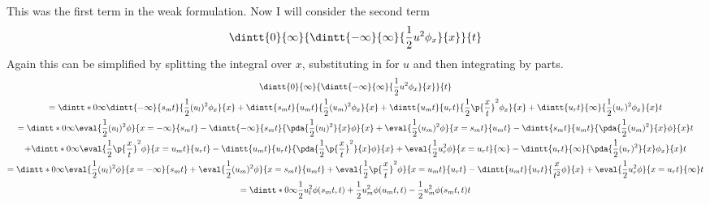 \documentclass[11pt, oneside]{article}
\begin{document}
\begin{enumerate}
    This was the first term in the weak formulation.
    Now I will consider the second term
    \[
      \dintt{0}{\infty}{\dintt{-\infty}{\infty}{\frac{1}{2}u^2 \phi_x}{x}}{t}
    \]
    Again this can be simplified by splitting the integral over $x$,
    substituting in for $u$ and then integrating by parts.
    \begin{gather*}
      \dintt{0}{\infty}{\dintt{-\infty}{\infty}{\frac{1}{2}u^2 \phi_x}{x}}{t} \\
      = \dintt*{0}{\infty}{\dintt{-\infty}{s_m t}{\frac{1}{2}(u_l)^2 \phi_x}{x} + \dintt{s_m t}{u_m t}{\frac{1}{2} (u_m)^2 \phi_x}{x} + \dintt{u_m t}{u_r t}{\frac{1}{2}\p{\frac{x}{t}}^2 \phi_x}{x} + \dintt{u_r t}{\infty}{\frac{1}{2} (u_r)^2 \phi_x}{x}}{t} \\
      = \dintt*{0}{\infty}{\eval{\frac{1}{2}(u_l)^2 \phi}{x = -\infty}{s_m t} - \dintt{-\infty}{s_m t}{\pda{\frac{1}{2}(u_l)^2}{x} \phi}{x} + \eval{\frac{1}{2} (u_m)^2 \phi}{x = s_m t}{u_m t} - \dintt{s_m t}{u_m t}{\pda{\frac{1}{2} (u_m)^2}{x} \phi}{x}}{t} \\
      + \dintt*{0}{\infty}{\eval{\frac{1}{2}\p{\frac{x}{t}}^2 \phi}{x = u_m t}{u_r t} - \dintt{u_m t}{u_r t}{\pda{\frac{1}{2}\p{\frac{x}{t}}^2}{x} \phi}{x} + \eval{\frac{1}{2}u_r^2 \phi}{x = u_r t}{\infty} - \dintt{u_r t}{\infty}{\pda{\frac{1}{2} (u_r)^2}{x} \phi_x}{x}}{t} \\
      = \dintt*{0}{\infty}{\eval{\frac{1}{2}(u_l)^2 \phi}{x = -\infty}{s_m t}  + \eval{\frac{1}{2} (u_m)^2 \phi}{x = s_m t}{u_m t} + \eval{\frac{1}{2}\p{\frac{x}{t}}^2 \phi}{x = u_m t}{u_r t} - \dintt{u_m t}{u_r t}{\frac{x}{t^2} \phi}{x} + \eval{\frac{1}{2}u_r^2 \phi}{x = u_r t}{\infty}}{t} \\
      = \dintt*{0}{\infty}{\frac{1}{2}u_l^2 \phi(s_m t, t) + \frac{1}{2} u_m^2 \phi(u_m t, t) - \frac{1}{2} u_m^2 \phi(s_m t, t)}{t} \\

\end{gather*}
\end{enumerate}
\end{document}
